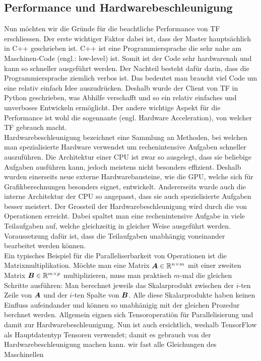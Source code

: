 \begin{appendices}
\section*{Performance und Hardwarebeschleunigung}
Nun möchten wir die Gründe für die beachtliche Performance von TF erschliessen.
Der erste wichtiger Faktor dabei ist, dass der Master hauptsächlich in C++
geschrieben ist. C++ ist eine Programmiersprache die sehr nahe am Maschinen-Code
(engl.: low-level) ist. Somit ist der Code sehr hardwarenah und kann so
schneller ausgeführt werden. Der Nachteil besteht dafür darin, dass die Programmiersprache
ziemlich verbos ist. Das bedeutet man braucht viel Code um eine relativ einfach Idee
auszudrücken. Deshalb wurde der Client von TF in Python geschrieben, was
Abhilfe verschafft und so ein relativ einfaches und unverboses Entwickeln ermöglicht.
\para{}
Der andere wichtige Aspekt für die Performance ist wohl die sogennante
 (engl. Hardware Acceleration), von welcher TF
gebrauch macht. \\
Hardwarebeschleunigung bezeichnet eine Sammlung an Methoden,
bei welchen man spezialisierte Hardware verwendet um rechenintensive Aufgaben
schneller auszuführen. Die Architektur einer CPU ist zwar so ausgelegt, dass
sie beliebige Aufgaben ausführen kann, jedoch meistens nicht besonders
effizient. Deshalb wurden einerseits neue externe Hardwarebausteine, wie die
GPU, welche sich für Grafikberechnungen besonders eignet, entwickelt.
Andererseits wurde auch die interne Architektur der CPU so angepasst, dass sie
auch spezielisierte Aufgaben besser meistert.
\para{}
Der Grossteil der Hardwarebeschleunigung wird durch die
 von Operationen erreicht. Dabei spaltet man eine
rechenintensive Aufgabe in viele Teilaufgaben auf, welche gleichzeitig in
gleicher Weise ausgeführt werden. Voraussetzung dafür ist, dass die
Teilaufgaben unabhängig voneinander bearbeitet werden können. \\
Ein typisches Beispiel für die Paralleliserbarkeit von Operationen ist die
Matrixmultiplikation. Möchte man eine Matrix $\bm{A} \in \mathbb{R}^{n \times m}$ mit
einer zweiten Matrix $\bm{B} \in \mathbb{R}^{m \times p}$ multiplizieren, muss man
praktisch $m$-mal die gleichen Schritte ausführen: Man berechnet jeweils das
Skalarprodukt zwischen der $i$-ten Zeile von $\bm{A}$ und der $i$-ten Spalte
von $\bm{B}$. Alle diese Skalarprodukte haben keinen Einfluss aufeindander und
können so unabhänigig mit der gleichen Prozedur berchnet werden.
\para{}
Allgemein eignen sich Tensoroperatiön für Parallelisierung und damit zur Hardwarebeschleunigung.
Nun ist auch ersichtlich, weshalb TensorFlow als Hauptdatentyp Tensoren
verwendet; damit es gebrauch von der Hardwarebeschleunigung machen kann. wir fast alle Gleichungen des Maschinellen


\end{appendices}
